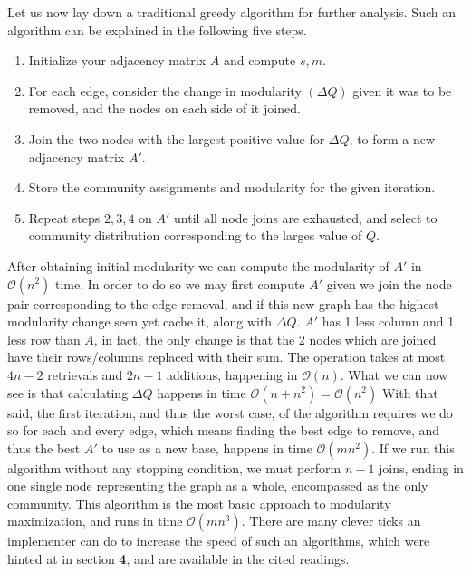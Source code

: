 \documentclass[a4paper, 10pt, twocolumn]{article}
\begin{document}
Let us now lay down a traditional greedy algorithm for further analysis.
Such an algorithm can be explained in the following five steps.

\begin{enumerate}
       \item Initialize your adjacency matrix $ A $ and compute $ s, m $.
       \item For each edge, consider the change in modularity $ (\Delta Q) $ given it was to be removed, and the nodes on each side of it joined.
       \item Join the two nodes with the largest positive value for $ \Delta Q $, to form a new adjacency matrix $ A' $.
       \item Store the community assignments and modularity for the given iteration.
       \item Repeat steps $ 2,3,4 $ on $ A' $ until all node joins are exhausted, and select to community distribution corresponding to the larges value of $ Q $.
\end{enumerate}

\noindent
After obtaining initial modularity we can compute the modularity of $ A' $ in $ \mathcal{O}(n^{2}) $ time. In order to do so we may first compute $ A' $ given we join the node pair corresponding to the edge removal, and if this new graph has the highest modularity change seen yet cache it, along with $ \Delta Q $.
$ A' $ has 1 less column and 1 less row than $ A $, in fact, the only change is that the 2 nodes which are joined have their rows/columns replaced with their sum.
The operation takes at most $ 4n -2 $ retrievals and $ 2n - 1 $ additions, happening in $ \mathcal{O}(n) $.
What we can now see is that calculating $ \Delta Q $ happens in time $ \mathcal{O}(n + n^{2}) = \mathcal{O}(n^{2})$
With that said, the first iteration, and thus the worst case, of the algorithm requires we do so for each and every edge, which means finding the best edge to remove, and thus the best $ A' $ to use as a new base, happens in time $ \mathcal{O}(mn^{2}) $.
If we run this algorithm without any stopping condition, we must perform $ n - 1 $ joins, ending in one single node representing the graph as a whole, encompassed as the only community.
This algorithm is the most basic approach to modularity maximization, and runs in time $ \mathcal{O}(mn^{3}) $.
There are many clever ticks an implementer can do to increase the speed of such an algorithms, which were hinted at in section \textbf{4}, and are available in the cited readings.
\end{document}
